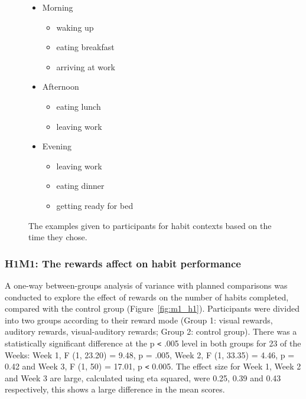 \begin{figure}[H]
  \centering
  \begin{itemize}
    \item Morning
    \begin{itemize}
      \item waking up
      \item eating breakfast
      \item arriving at work
    \end{itemize}
    \item Afternoon
    \begin{itemize}
      \item eating lunch
      \item leaving work
    \end{itemize}
    \item Evening
    \begin{itemize}
      \item leaving work
      \item eating dinner
      \item getting ready for bed
    \end{itemize}
  \end{itemize}
  \caption{The examples given to participants for habit contexts based on the time they chose.}
  \label{fig:habit_context_example}
\end{figure}



\subsubsection*{H1M1: The rewards affect on habit performance}

A one-way between-groups analysis of variance with planned comparisons was conducted to explore the effect of rewards on the number of habits completed, compared with the control group (Figure~\ref{fig:m1_h1}). Participants were divided into two groups according to their reward mode (Group 1: visual rewards, auditory rewards, visual-auditory rewards; Group 2: control group). There was a statistically significant difference at the p \verb|<| .005 level in both groups for 2\/3 of the Weeks: Week 1, F (1, 23.20) = 9.48, p = .005, Week 2, F (1, 33.35) = 4.46, p = 0.42 and Week 3, F (1, 50) = 17.01, p \verb|<| 0.005. The effect size for Week 1, Week 2 and Week 3 are large, calculated using eta squared, were 0.25, 0.39 and 0.43 respectively, this shows a large difference in the mean scores.


